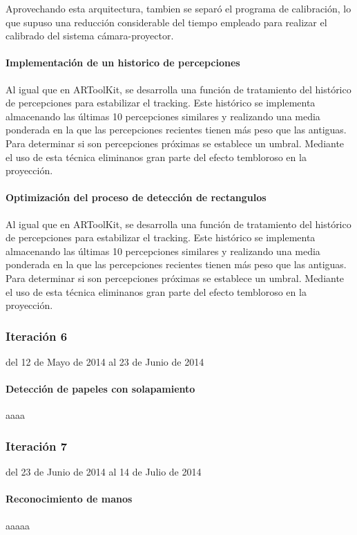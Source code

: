Aprovechando esta arquitectura, tambien se separó el programa de calibración, lo que supuso una reducción considerable del tiempo empleado para realizar el calibrado del sistema cámara-proyector.
 
\paragraph{Implementación de un historico de percepciones}
Al igual que en ARToolKit, se desarrolla una función de tratamiento del histórico de percepciones para estabilizar el tracking. Este histórico se implementa  almacenando las últimas 10 percepciones similares y realizando una media ponderada en la que las percepciones recientes tienen más peso que las antiguas. Para determinar si son percepciones próximas se establece un umbral. Mediante el uso de esta técnica eliminanos gran parte del efecto tembloroso en la proyección.
\paragraph{Optimización del proceso de detección de rectangulos}
Al igual que en ARToolKit, se desarrolla una función de tratamiento del histórico de percepciones para estabilizar el tracking. Este histórico se implementa  almacenando las últimas 10 percepciones similares y realizando una media ponderada en la que las percepciones recientes tienen más peso que las antiguas. Para determinar si son percepciones próximas se establece un umbral. Mediante el uso de esta técnica eliminanos gran parte del efecto tembloroso en la proyección.

\subsubsection{Iteración 6}
del 12 de Mayo de 2014 al 23 de Junio de 2014
\paragraph{Detección de papeles con solapamiento}
 aaaa

\subsubsection{Iteración 7}
del 23 de Junio de 2014 al 14 de Julio de 2014
\paragraph{Reconocimiento de manos}
aaaaa


